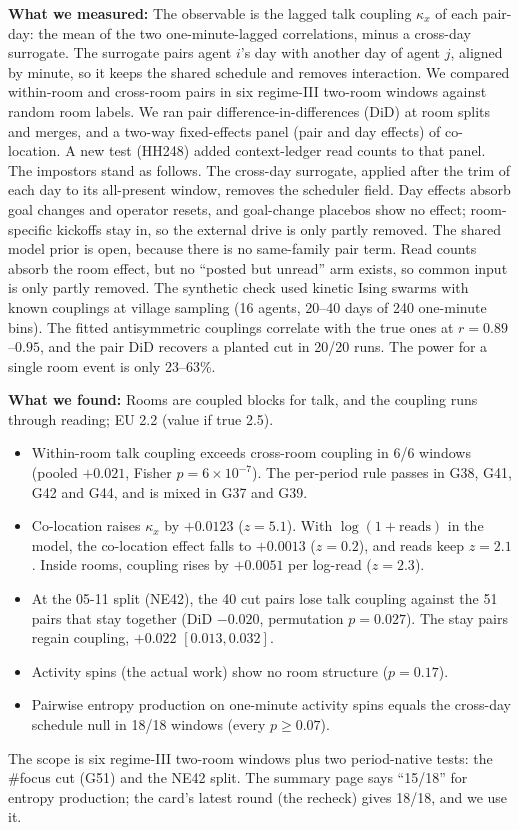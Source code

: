 \textbf{What we measured:} The observable is the lagged talk coupling $\kappa_x$ of each pair-day: the mean of the two one-minute-lagged correlations, minus a cross-day surrogate. The surrogate pairs agent $i$'s day with another day of agent $j$, aligned by minute, so it keeps the shared schedule and removes interaction. We compared within-room and cross-room pairs in six regime-III two-room windows against random room labels. We ran pair difference-in-differences (DiD) at room splits and merges, and a two-way fixed-effects panel (pair and day effects) of co-location. A new test (HH248) added context-ledger read counts to that panel.
The impostors stand as follows. The cross-day surrogate, applied after the trim of each day to its all-present window, removes the scheduler field. Day effects absorb goal changes and operator resets, and goal-change placebos show no effect; room-specific kickoffs stay in, so the external drive is only partly removed. The shared model prior is open, because there is no same-family pair term. Read counts absorb the room effect, but no ``posted but unread'' arm exists, so common input is only partly removed.
The synthetic check used kinetic Ising swarms with known couplings at village sampling (16 agents, 20--40 days of 240 one-minute bins). The fitted antisymmetric couplings correlate with the true ones at $r=0.89$--$0.95$, and the pair DiD recovers a planted cut in 20/20 runs. The power for a single room event is only 23--63\%.

\textbf{What we found:} Rooms are coupled blocks for talk, and the coupling runs through reading; EU 2.2 (value if true 2.5).
\begin{itemize}\setlength{\itemsep}{0pt}\setlength{\parskip}{0pt}
\item Within-room talk coupling exceeds cross-room coupling in 6/6 windows (pooled $+0.021$, Fisher $p=6\times10^{-7}$). The per-period rule passes in G38, G41, G42 and G44, and is mixed in G37 and G39.
\item Co-location raises $\kappa_x$ by $+0.0123$ ($z=5.1$). With $\log(1+\text{reads})$ in the model, the co-location effect falls to $+0.0013$ ($z=0.2$), and reads keep $z=2.1$. Inside rooms, coupling rises by $+0.0051$ per log-read ($z=2.3$).
\item At the 05-11 split (NE42), the 40 cut pairs lose talk coupling against the 51 pairs that stay together (DiD $-0.020$, permutation $p=0.027$). The stay pairs regain coupling, $+0.022$ $[0.013, 0.032]$.
\item Activity spins (the actual work) show no room structure ($p=0.17$).
\item Pairwise entropy production on one-minute activity spins equals the cross-day schedule null in 18/18 windows (every $p\ge0.07$).
\end{itemize}
The scope is six regime-III two-room windows plus two period-native tests: the \#focus cut (G51) and the NE42 split. The summary page says ``15/18'' for entropy production; the card's latest round (the recheck) gives 18/18, and we use it.

